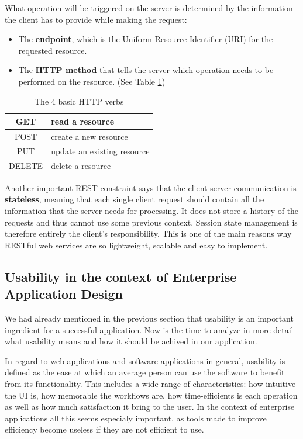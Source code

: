 What operation will be triggered on the server is determined by the information the client has to provide while making the request:

\begin{itemize}
    \item The \textbf{endpoint}, which is the Uniform Resource Identifier (URI) for the requested resource.
    \item The \textbf{HTTP method} that tells the server which operation needs to be performed on the resource. (See Table \ref{httpVerbs})
\end{itemize}

\begin{table}[H]
    \centering
    \begin{tabular}{|c|l|}
        \hline
        GET    & read a resource             \\ \hline
        POST   & create a new resource       \\ \hline
        PUT    & update an existing resource \\ \hline
        DELETE & delete a resource           \\ \hline
    \end{tabular}
    \caption{The 4 basic HTTP verbs}
    \label{httpVerbs}
\end{table}

Another important REST constraint says that the client-server communication is \textbf{stateless}, meaning that each single client request should contain all the information that the server needs for processing. It does not store a history of the requests and thus cannot use some previous context. Session state management is therefore entirely the client's responsibility. This is one of the main reasons why RESTful web services are so lightweight, scalable and easy to implement.


\subsection{Usability in the context of Enterprise Application Design}
\label{subsection:usability}

We had already mentioned in the previous section that usability is an important ingredient for a successful application. Now is the time to analyze in more detail what usability means and how it should be achived in our application.

In regard to web applications and software applications in general, usability is defined as the ease at which an average person can use the software to benefit from its functionality. This includes a wide range of characteristics: how intuitive the UI is, how memorable the workflows are, how time-efficients is each operation as well as how much satisfaction it bring to the user. In the context of enterprise applications all this seems especialy important, as tools made to improve efficiency become useless if they are not efficient to use.

